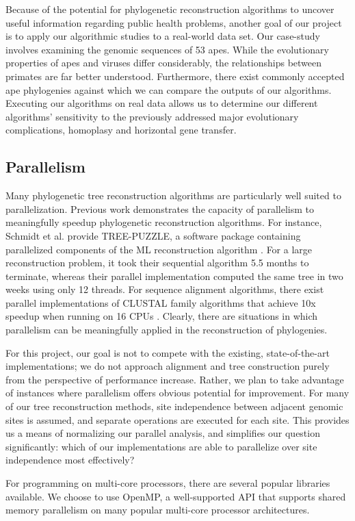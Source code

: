 \documentclass[10pt,twocolumn]{article}
\begin{document}
Because of the potential for phylogenetic reconstruction algorithms
to uncover useful information regarding public health problems,
another goal of our project is to apply our algorithmic studies to a
real-world data set. Our case-study involves examining the genomic
sequences of 53 apes. While the evolutionary properties of apes and viruses
differ considerably, the relationships between primates are far better understood.
Furthermore, there exist commonly accepted ape phylogenies against which we can
compare the outputs of our algorithms. Executing our algorithms on real data
allows us to determine our different algorithms' sensitivity to the previously
addressed major evolutionary complications, homoplasy and horizontal gene transfer. 

\subsection*{Parallelism} 
Many phylogenetic tree reconstruction algorithms are
particularly well suited to parallelization. Previous work demonstrates
the capacity of parallelism to meaningfully speedup phylogenetic
reconstruction algorithms. For instance, Schmidt et al. provide
TREE-PUZZLE, a software package containing parallelized components of
the ML reconstruction algorithm \cite{schmidt2002tree}.
For a large reconstruction problem, it took their sequential algorithm
5.5 months to terminate, whereas their parallel implementation computed
the same tree in two weeks using only 12 threads. For sequence alignment
algorithms, there exist parallel implementations of CLUSTAL family
algorithms that achieve 10x speedup when running on 16 CPUs 
\cite{chenna2003multiple}. Clearly, there are situations in which
parallelism can be meaningfully applied in the reconstruction of
phylogenies.

For this project, our goal is not to compete with the 
existing, state-of-the-art implementations; we do not approach
alignment and tree construction purely from the perspective of performance
increase. Rather, we plan to take advantage of instances where
parallelism offers obvious potential for improvement. For many of our tree
reconstruction methods, site independence between adjacent genomic sites
is assumed, and separate operations are executed for each site. This provides
us a means of normalizing our parallel analysis, and simplifies our question
significantly: which of our implementations are able to parallelize
over site independence most effectively?


For programming on multi-core processors, there are several popular libraries available.
We choose to use OpenMP, a
well-supported API that supports shared memory parallelism on many popular
multi-core processor architectures.
\end{document}
